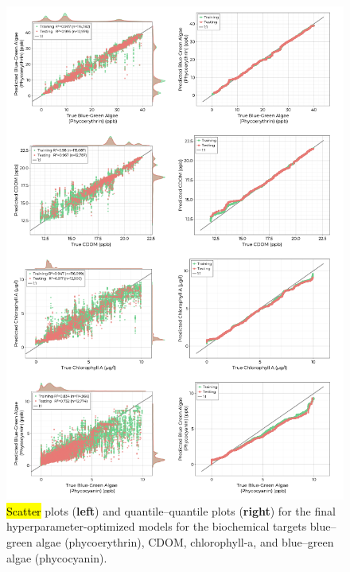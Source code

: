 \documentclass[remotesensing,article,accept,pdftex,moreauthors]{Definitions/mdpi}
\begin{document}
\begin{figure}[H]

\vspace{-0.15in}
\hspace{-6pt}\includegraphics[width=\columnwidth]{figures/results/fits/biochemical-fitres.png}
\vspace{-0.1in}
\caption{\hl{Scatter} %
 plots (\textbf{left}) and quantile--quantile plots (\textbf{right}) for the final hyperparameter-optimized models for the biochemical targets blue--green algae (phycoerythrin), CDOM, chlorophyll-a, and blue--green algae (phycocyanin). \label{fig:biochem-fit}}
\end{figure}  
\end{document}
